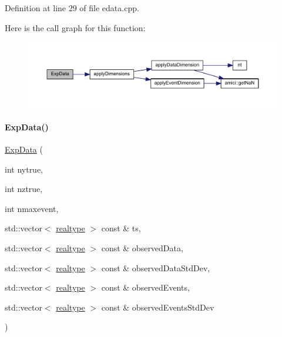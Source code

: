 Definition at line 29 of file edata.\+cpp.

Here is the call graph for this function\+:
\nopagebreak
\begin{figure}[H]
\begin{center}
\leavevmode
\includegraphics[width=350pt]{classamici_1_1_exp_data_a4dc836c2db72abcd32318fc6654fc131_cgraph}
\end{center}
\end{figure}
\mbox{\label{classamici_1_1_exp_data_af7b389e6ef9cd1cd5facacc783a8e1e9}} 
\paragraph{\texorpdfstring{ExpData()}{ExpData()}\hspace{0.1cm}{\footnotesize\ttfamily [6/9]}}
{\footnotesize\ttfamily \mbox{\hyperlink{classamici_1_1_exp_data}{Exp\+Data}} (\begin{DoxyParamCaption}\item[{int}]{nytrue,  }\item[{int}]{nztrue,  }\item[{int}]{nmaxevent,  }\item[{std\+::vector$<$ \mbox{\hyperlink{namespaceamici_a1bdce28051d6a53868f7ccbf5f2c14a3}{realtype}} $>$ const \&}]{ts,  }\item[{std\+::vector$<$ \mbox{\hyperlink{namespaceamici_a1bdce28051d6a53868f7ccbf5f2c14a3}{realtype}} $>$ const \&}]{observed\+Data,  }\item[{std\+::vector$<$ \mbox{\hyperlink{namespaceamici_a1bdce28051d6a53868f7ccbf5f2c14a3}{realtype}} $>$ const \&}]{observed\+Data\+Std\+Dev,  }\item[{std\+::vector$<$ \mbox{\hyperlink{namespaceamici_a1bdce28051d6a53868f7ccbf5f2c14a3}{realtype}} $>$ const \&}]{observed\+Events,  }\item[{std\+::vector$<$ \mbox{\hyperlink{namespaceamici_a1bdce28051d6a53868f7ccbf5f2c14a3}{realtype}} $>$ const \&}]{observed\+Events\+Std\+Dev }\end{DoxyParamCaption})}


